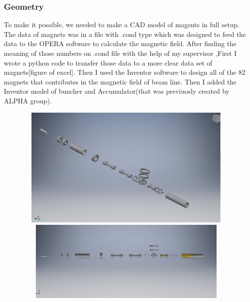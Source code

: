 \documentclass{article}
\begin{document}
\subsubsection{Geometry}
To make it possible, we needed to make a CAD model of magents in full setup. The data of magnets was in a file with .cond type which was designed to feed the data to the OPERA software to calculate the magnetic field. After finding the meaning of those numbers on .cond file with the help of my supervisor ,First I wrote a python code to transfer those data to a more clear data set of magnets[figure of excel]. Then I used the Inventor software to design all of the 82 magnets that contributes in the magnetic field of beam line. Then I added the Inventor model of buncher and Accumulator(that was previuosly created by ALPHA group).

\begin{figure}[h]
\centering
\includegraphics[width=120mm, height=60mm]{full-beam-line}
\\

\includegraphics[width=120mm,
height=40mm]{full-beam-line-half}
\end{figure}
\end{document}
